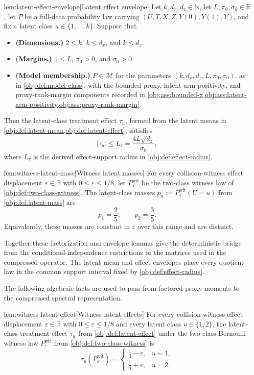 \begin{lemmav}{lem:latent-effect-envelope}[Latent effect envelope]
Let \(k,d_x,d_z\in\mathbb N\), let \(L,\pi_0,\sigma_0\in\mathbb R\), let \(P\) be a full-data probability law carrying \((U,T,X,Z,Y(0),Y(1),Y)\), and fix a latent class \(u\in\{1,\ldots,k\}\). Suppose that
\begin{itemize}
\item \textbf{(Dimensions.)} \(2\le k\), \(k\le d_x\), and \(k\le d_z\).
\item \textbf{(Margins.)} \(1\le L\), \(\pi_0>0\), and \(\sigma_0>0\).
\item \textbf{(Model membership.)} \(P\in\mathcal M\) for the parameters \((k,d_x,d_z,L,\pi_0,\sigma_0)\), as in \cref{obj:def:model-class}, with the bounded-proxy, latent-arm-positivity, and proxy-rank-margin components recorded in \cref{obj:ass:bounded-x,obj:ass:latent-arm-positivity,obj:ass:proxy-rank-margin}.
\end{itemize}
Then the latent-class treatment effect \(\tau_u\), formed from the latent means in \cref{obj:def:latent-mean,obj:def:latent-effect}, satisfies
\[
|\tau_u|\le L_\tau=\frac{4L\sqrt{d_z}}{\sigma_0},
\]
where \(L_\tau\) is the derived effect-support radius in \cref{obj:def:effect-radius}.
\end{lemmav}

\begin{lemmav}{lem:witness-latent-mass}[Witness latent masses]
For every collision-witness effect displacement \(\varepsilon\in\mathbb R\) with \(0\le \varepsilon\le 1/8\), let \(P_{\varepsilon}^{\mathrm{wit}}\) be the two-class witness law of \cref{obj:def:two-class-witness}.  The latent-class masses \(p_u:=P_{\varepsilon}^{\mathrm{wit}}(U=u)\) from \cref{obj:def:latent-mass} are
\[
p_1=\frac25,
\qquad
p_2=\frac35 .
\]
Equivalently, these masses are constant in \(\varepsilon\) over this range and are distinct.
\end{lemmav}

Together these factorization and envelope lemmas give the deterministic bridge from the conditional-independence restrictions to the matrices used in the compressed operator. The latent mean and effect envelopes place every quotient law in the common support interval fixed by \cref{obj:def:effect-radius}.

The following algebraic facts are used to pass from factored proxy moments to the compressed spectral representation.

\begin{lemmav}{lem:witness-latent-effect}[Witness latent effects]
For every collision-witness effect displacement \(\varepsilon\in\mathbb R\) with \(0\le \varepsilon\le 1/8\) and every latent class \(u\in\{1,2\}\), the latent-class treatment effect \(\tau_u\) from \cref{obj:def:latent-effect} under the two-class Bernoulli witness law \(P_{\varepsilon}^{\mathrm{wit}}\) from \cref{obj:def:two-class-witness} is
\[
\tau_u(P_{\varepsilon}^{\mathrm{wit}})
=
\begin{cases}
\frac14-\varepsilon, & u=1,\\
\frac14+\varepsilon, & u=2.
\end{cases}
\]
\end{lemmav}


